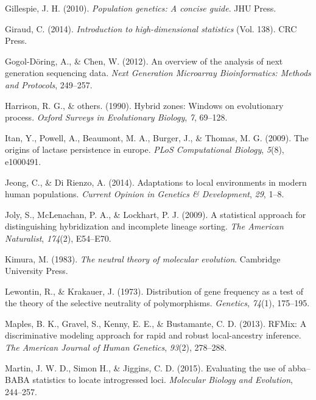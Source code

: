 \documentclass[12pt,a4paper,twoside]{ugathesis}
\theoremstyle{definition}
\theoremstyle{definition}
\theoremstyle{remark}
\begin{document}
\hypertarget{ref-gillespie2010population}{}
Gillespie, J. H. (2010). \emph{Population genetics: A concise guide}.
JHU Press.

\hypertarget{ref-giraud2014introduction}{}
Giraud, C. (2014). \emph{Introduction to high-dimensional statistics}
(Vol. 138). CRC Press.

\hypertarget{ref-gogol2012overview}{}
Gogol-Döring, A., \& Chen, W. (2012). An overview of the analysis of
next generation sequencing data. \emph{Next Generation Microarray
Bioinformatics: Methods and Protocols}, 249--257.

\hypertarget{ref-harrison1990hybrid}{}
Harrison, R. G., \& others. (1990). Hybrid zones: Windows on
evolutionary process. \emph{Oxford Surveys in Evolutionary Biology},
\emph{7}, 69--128.

\hypertarget{ref-itan2009origins}{}
Itan, Y., Powell, A., Beaumont, M. A., Burger, J., \& Thomas, M. G.
(2009). The origins of lactase persistence in europe. \emph{PLoS
Computational Biology}, \emph{5}(8), e1000491.

\hypertarget{ref-jeong2014adaptations}{}
Jeong, C., \& Di Rienzo, A. (2014). Adaptations to local environments in
modern human populations. \emph{Current Opinion in Genetics \&
Development}, \emph{29}, 1--8.

\hypertarget{ref-joly2009statistical}{}
Joly, S., McLenachan, P. A., \& Lockhart, P. J. (2009). A statistical
approach for distinguishing hybridization and incomplete lineage
sorting. \emph{The American Naturalist}, \emph{174}(2), E54--E70.

\hypertarget{ref-kimura1983neutral}{}
Kimura, M. (1983). \emph{The neutral theory of molecular evolution}.
Cambridge University Press.

\hypertarget{ref-lewontin1973distribution}{}
Lewontin, R., \& Krakauer, J. (1973). Distribution of gene frequency as
a test of the theory of the selective neutrality of polymorphisms.
\emph{Genetics}, \emph{74}(1), 175--195.

\hypertarget{ref-maples2013rfmix}{}
Maples, B. K., Gravel, S., Kenny, E. E., \& Bustamante, C. D. (2013).
RFMix: A discriminative modeling approach for rapid and robust
local-ancestry inference. \emph{The American Journal of Human Genetics},
\emph{93}(2), 278--288.

\hypertarget{ref-martin2000}{}
Martin, J. W. D., Simon H., \& Jiggins, C. D. (2015). Evaluating the use
of abba--BABA statistics to locate introgressed loci. \emph{Molecular
Biology and Evolution}, 244--257.
\end{document}
